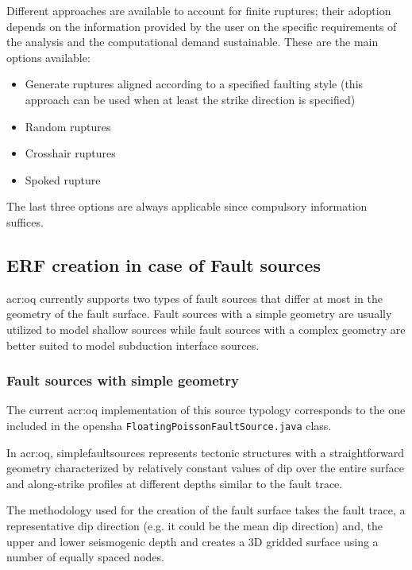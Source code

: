{Different approaches are available to account for finite ruptures;
their adoption depends on the information provided by the user on
the specific requirements of the analysis and the computational demand
sustainable. 
%
These are the main options available:
\begin{itemize}
	\item Generate ruptures aligned according to a specified faulting style 
	(this approach can be used when at least the strike direction is 
	specified)
	\item Random ruptures 
	\item Crosshair ruptures
	\item Spoked rupture
\end{itemize}
The last three options are always applicable since compulsory information 
suffices.
%
\subsection{ERF creation in case of Fault sources}
\gls{acr:oq} currently supports two types of fault sources that 
differ at most in the geometry of the fault surface. 
%
Fault sources with a simple geometry are usually utilized to model 
shallow sources while fault sources with a complex geometry are 
better suited to model subduction interface sources.
%
\subsubsection{Fault sources with simple geometry}
%
The current \gls{acr:oq} implementation of this source typology 
corresponds to the one included in the \gls{opensha}
\texttt{FloatingPoissonFaultSource.java} class.

In \gls{acr:oq}, \glspl{simplefaultsource} represents tectonic structures 
with a straightforward geometry characterized by relatively constant 
values of dip over the entire surface and along-strike profiles at 
different depths similar to the fault trace. 

The methodology used for the creation of the fault surface takes the 
fault trace, a representative dip direction (e.g. it could be the mean 
dip direction) and, the upper and lower seismogenic depth and creates 
a 3D gridded surface using a number of equally spaced nodes. 
%
}

